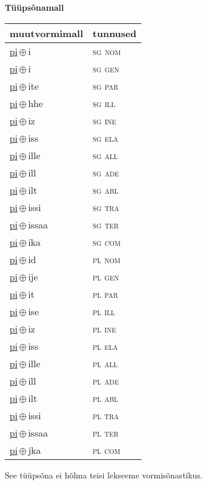

\vspace{3.5em}
\noindent \begin{minipage}{\textwidth}
\noindent \textbf{Tüüpsõnamall \,}\\

\begin{sideways}
\begin{tabular}{l l}
muutvormimall & tunnused \\
\hline
\underline{pi}\,$\oplus$\,i & \textsc{ sg nom } \\
\underline{pi}\,$\oplus$\,i & \textsc{ sg gen } \\
\underline{pi}\,$\oplus$\,ite & \textsc{ sg par } \\
\underline{pi}\,$\oplus$\,hhe & \textsc{ sg ill } \\
\underline{pi}\,$\oplus$\,iz & \textsc{ sg ine } \\
\underline{pi}\,$\oplus$\,iss & \textsc{ sg ela } \\
\underline{pi}\,$\oplus$\,ille & \textsc{ sg all } \\
\underline{pi}\,$\oplus$\,ill & \textsc{ sg ade } \\
\underline{pi}\,$\oplus$\,ilt & \textsc{ sg abl } \\
\underline{pi}\,$\oplus$\,issi & \textsc{ sg tra } \\
\underline{pi}\,$\oplus$\,issaa & \textsc{ sg ter } \\
\underline{pi}\,$\oplus$\,ika & \textsc{ sg com } \\
\underline{pi}\,$\oplus$\,id & \textsc{ pl nom } \\
\underline{pi}\,$\oplus$\,ije & \textsc{ pl gen } \\
\underline{pi}\,$\oplus$\,it & \textsc{ pl par } \\
\underline{pi}\,$\oplus$\,ise & \textsc{ pl ill } \\
\underline{pi}\,$\oplus$\,iz & \textsc{ pl ine } \\
\underline{pi}\,$\oplus$\,iss & \textsc{ pl ela } \\
\underline{pi}\,$\oplus$\,ille & \textsc{ pl all } \\
\underline{pi}\,$\oplus$\,ill & \textsc{ pl ade } \\
\underline{pi}\,$\oplus$\,ilt & \textsc{ pl abl } \\
\underline{pi}\,$\oplus$\,issi & \textsc{ pl tra } \\
\underline{pi}\,$\oplus$\,issaa & \textsc{ pl ter } \\
\underline{pi}\,$\oplus$\,jka & \textsc{ pl com } \\
\end{tabular}
\end{sideways}
\label{tab:tüüpsõnamall-pii}

\end{minipage}

 
\vspace{1em}
\noindent See tüüpsõna ei hõlma teisi lekseeme vormi\-sõnastikus.
